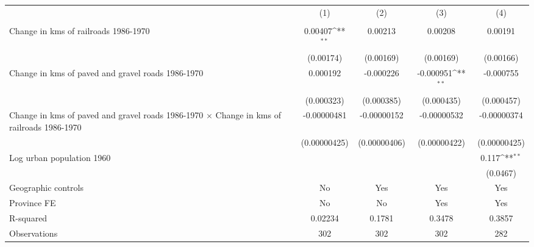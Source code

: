 {
\def\sym#1{\ifmmode^{#1}\else\(^{#1}\)\fi}
\begin{tabular}{l*{4}{c}}
\hline\hline
                &\multicolumn{1}{c}{(1)}&\multicolumn{1}{c}{(2)}&\multicolumn{1}{c}{(3)}&\multicolumn{1}{c}{(4)}\\
                &\multicolumn{1}{c}{}&\multicolumn{1}{c}{}&\multicolumn{1}{c}{}&\multicolumn{1}{c}{}\\
\hline
Change in kms of railroads 1986-1970&  0.00407\sym{**} &  0.00213         &  0.00208         &  0.00191         \\
                &(0.00174)         &(0.00169)         &(0.00169)         &(0.00166)         \\
[1em]
Change in kms of paved and gravel roads 1986-1970& 0.000192         &-0.000226         &-0.000951\sym{**} &-0.000755         \\
                &(0.000323)         &(0.000385)         &(0.000435)         &(0.000457)         \\
[1em]
Change in kms of paved and gravel roads 1986-1970 $\times$ Change in kms of railroads 1986-1970&-0.00000481         &-0.00000152         &-0.00000532         &-0.00000374         \\
                &(0.00000425)         &(0.00000406)         &(0.00000422)         &(0.00000425)         \\
[1em]
Log urban population 1960&                  &                  &                  &    0.117\sym{**} \\
                &                  &                  &                  & (0.0467)         \\
\hline
Geographic controls&       No         &      Yes         &      Yes         &      Yes         \\
Province FE     &       No         &       No         &      Yes         &      Yes         \\
R-squared       &  0.02234         &   0.1781         &   0.3478         &   0.3857         \\
Observations    &      302         &      302         &      302         &      282         \\
\hline\hline
\end{tabular}
}

